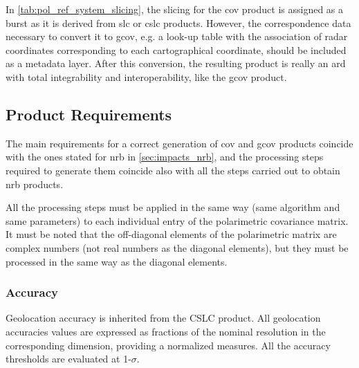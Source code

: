 In \autoref{tab:pol_ref_system_slicing}, the slicing for the \acs{cov} product is assigned as a burst as it is derived from \acs{slc} or \acs{cslc} products. However, the correspondence data necessary to convert it to \acs{gcov}, e.g. a look-up table with the association of radar coordinates corresponding to each cartographical coordinate, should be included as a metadata layer. After this conversion, the resulting product is really an \acs{ard} with total integrability and interoperability, like the \acs{gcov} product.

\subsection{Product Requirements}
\label{sec:impacts_pol}

The main requirements for a correct generation of \acs{cov} and \acs{gcov} products coincide with the ones stated for \acs{nrb} in \autoref{sec:impacts_nrb}, and the processing steps required to generate them coincide also with all the steps carried out to obtain \acs{nrb} products. 

All the processing steps must be applied in the same way (same algorithm and same parameters) to each individual entry of the polarimetric covariance matrix. It must be noted that the off-diagonal elements of the polarimetric matrix are complex numbers (not real numbers as the diagonal elements),  but they must be processed in the same way as the diagonal elements.



\subsubsection{Accuracy}

Geolocation accuracy is inherited from the CSLC product. All geolocation accuracies values are expressed as fractions of the nominal resolution in the corresponding dimension, providing a normalized measures. All the accuracy thresholds are evaluated at 1-$\sigma$.

